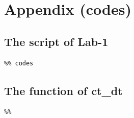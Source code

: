 \documentclass[12pt]{article}
\begin{document}



\pagebreak

\begin{enumerate}



\newpage

\newpage











\end{enumerate}



\newpage



\newpage
\section{Appendix (codes)}
\subsection{The script of Lab-1}

\begin{lstlisting}
%% codes
\end{lstlisting}
\subsection{The function of ct\_dt}
\begin{lstlisting}
%%

\end{lstlisting}
\end{document}
